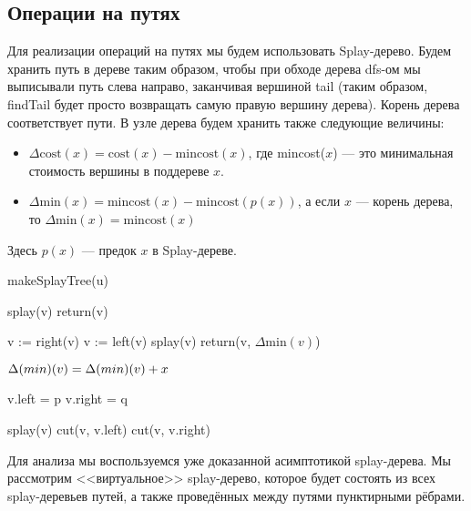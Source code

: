 \subsection{Операции на путях}

Для реализации операций на путях мы будем использовать Splay-дерево. Будем хранить путь в дереве таким образом, чтобы при обходе дерева dfs-ом мы выписывали путь слева направо, заканчивая вершиной tail (таким образом, findTail будет просто возвращать самую правую вершину дерева). Корень дерева соответствует пути. В узле дерева будем хранить также следующие величины:

\begin{itemize}
    \item $\Delta \text{cost}(x) = \text{cost}(x) - \text{mincost}(x)$, где mincost($x$) --- это минимальная стоимость вершины в поддереве $x$.
    \item $\Delta \text{min}(x) = \text{mincost}(x) - \text{mincost}(p(x))$, а если $x$ --- корень дерева, то $\Delta \text{min}(x) = \text{mincost}(x)$
\end{itemize}

Здесь $p(x)$ --- предок $x$ в Splay-дереве.

\begin{algorithmic}[1]
		\State makeSplayTree(u)
    \EndProcedure
    
		\State splay(v)
		\State return(v)
    \EndProcedure
    
                \State v := right(v)
            \Else
                \State v := left(v)
            \EndIf
        \EndWhile
        \State splay(v)
        \State return(v, $\Delta \text{min}(v)$)
    \EndProcedure
    
        \State $\Delta \text(min)(v) = \Delta \text(min)(v) + x$
    \EndProcedure
    
		\State v.left = p
		\State v.right = q
    \EndProcedure
    
		\State splay(v)
		\State cut(v, v.left)
		\State cut(v, v.right)
    \EndProcedure
	
\end{algorithmic}

Для анализа мы воспользуемся уже доказанной асимптотикой splay-дерева. Мы рассмотрим <<виртуальное>> splay-дерево, которое будет состоять из всех splay-деревьев путей, а также проведённых между путями пунктирными рёбрами.

